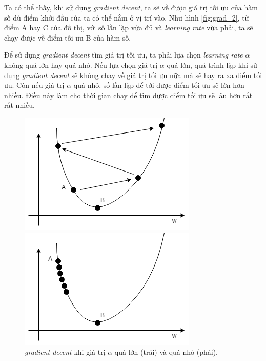 Ta có thể thấy, khi sử dụng \textit{gradient decent}, ta sẽ về được giá trị tối ưu của hàm số dù điểm khởi đầu của ta có thể nằm ở vị trí vào. Như hình \ref{fig:grad_2}, từ điểm A hay C của đồ thị, với số lần lặp vừa đủ và \textit{learning rate} vừa phải, ta sẽ chạy được về điểm tối ưu B của hàm số.

Để sử dụng \textit{gradient decent} tìm giá trị tối ưu, ta phải lựa chọn \textit{learning rate} $\alpha$ không quá lớn hay quá nhỏ. Nếu lựa chọn giá trị $\alpha$ quá lớn, quá trình lặp khi sử dụng \textit{gradient decent} sẽ không chạy về giá trị tối ưu nữa mà sẽ hạy ra xa điểm tối ưu. Còn nếu giá trị $\alpha$ quá nhỏ, số lần lặp để tới được điểm tối ưu sẽ lớn hơn nhiều. Điều này làm cho thời gian chạy để tìm được điểm tối ưu sẽ lâu hơn rất rất nhiều.

\clearpage
\begin{figure}[!htb]
   \begin{minipage}{0.48\textwidth}
     \centering
     \includegraphics[width=1\linewidth]{books/artificial-neural-network/chapter02/figure/grad_3.png}
   \end{minipage}\hfill
   \begin{minipage}{0.48\textwidth}
     \centering
     \includegraphics[width=1\linewidth]{books/artificial-neural-network/chapter02/figure/grad_4.png}
   \end{minipage}
   \caption{\textit{gradient decent} khi giá trị $\alpha$ quá lớn (trái) và quá nhỏ (phải).}
\end{figure}

